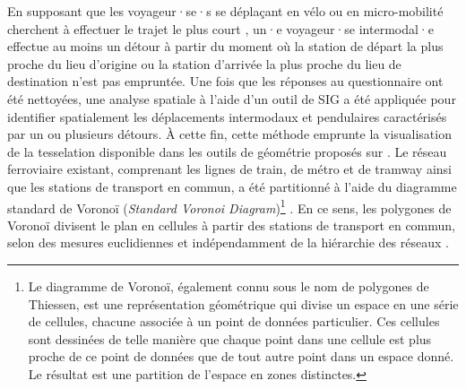 \begin{refsegment}
En supposant que les voyageur·se·s se déplaçant en vélo ou en micro-mobilité cherchent à effectuer le trajet le plus court \textcolor{blue}{\autocite[116]{heran_distances_2009}}, un·e voyageur·se intermodal·e effectue au moins un détour à partir du moment où la station de départ la plus proche du lieu d'origine ou la station d'arrivée la plus proche du lieu de destination n'est pas empruntée. Une fois que les réponses au questionnaire ont été nettoyées, une analyse spatiale à l'aide d'un outil de \acrshort{SIG} a été appliquée pour identifier spatialement les déplacements intermodaux et pendulaires caractérisés par un ou plusieurs détours. À cette fin, cette méthode emprunte la visualisation de la tesselation disponible dans les outils de géométrie proposés sur . Le réseau ferroviaire existant, comprenant les lignes de train, de métro et de tramway ainsi que les stations de transport en commun, a été partitionné à l'aide du diagramme standard de Voronoï (\textsl{Standard Voronoi Diagram})\footnote{
Le diagramme de Voronoï, également connu sous le nom de polygones de Thiessen, est une représentation géométrique qui divise un espace en une série de cellules, chacune associée à un point de données particulier. Ces cellules sont dessinées de telle manière que chaque point dans une cellule est plus proche de ce point de données que de tout autre point dans un espace donné. Le résultat est une partition de l'espace en zones distinctes.
} \textcolor{blue}{\autocite[479]{mota_method_2014}}. En ce sens, les polygones de Voronoï divisent le plan en cellules à partir des stations de transport en commun, selon des mesures euclidiennes et indépendamment de la hiérarchie des réseaux \textcolor{blue}{\autocite[429]{lebedeva_increasing_2018}}.%


\end{refsegment}

